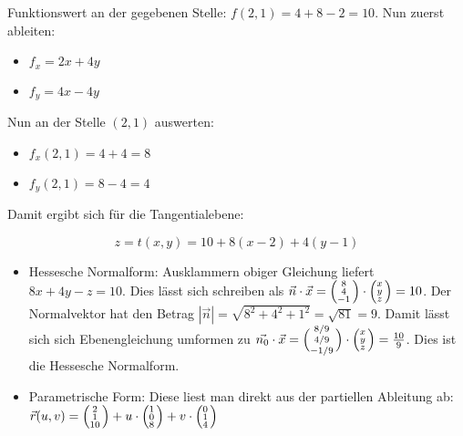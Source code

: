 \item Funktionswert an der gegebenen Stelle: $f(2,1) = 4+8-2=10$. Nun zuerst ableiten:

\begin{itemize}
\item $f_x = 2x+4y$
\item $f_y = 4x-4y$
\end{itemize}

Nun an der Stelle $(2,1)$ auswerten:

\begin{itemize}
\item $f_x(2,1) = 4+4 = 8$
\item $f_y(2,1) = 8-4 = 4$
\end{itemize}

Damit ergibt sich für die Tangentialebene:

$$z = t(x,y) = 10 + 8(x-2) + 4(y-1)$$

\begin{itemize}
\item Hessesche Normalform: Ausklammern obiger Gleichung liefert $8x+4y-z=10$. Dies lässt sich schreiben als $\vec{n}\cdot\vec{x} = \Bigl(\negthinspace\begin{smallmatrix}8\\4\\-1\end{smallmatrix}\Bigr)\cdot\Bigl(\negthinspace\begin{smallmatrix}x\\y\\z\end{smallmatrix}\Bigr) = 10$. Der Normalvektor hat den Betrag $|\vec{n}| = \sqrt{8^2+4^2+1^2} = \sqrt{81} = 9$. Damit lässt sich sich Ebenengleichung umformen zu $\vec{n_0}\cdot\vec{x} = \Bigl(\negthinspace\begin{smallmatrix}8/9\\4/9\\-1/9\end{smallmatrix}\Bigr)\cdot\Bigl(\negthinspace\begin{smallmatrix}x\\y\\z\end{smallmatrix}\Bigr) = \frac{10}{9}$. Dies ist die Hessesche Normalform.
\item Parametrische Form: Diese liest man direkt aus der partiellen Ableitung ab: $\vec{r}(u,v) = \Bigl(\negthinspace\begin{smallmatrix}2\\1\\10\end{smallmatrix}\Bigr) + u \cdot \Bigl(\negthinspace\begin{smallmatrix}1\\0\\8\end{smallmatrix}\Bigr) + v \cdot \Bigl(\negthinspace\begin{smallmatrix}0\\1\\4\end{smallmatrix}\Bigr)$
\end{itemize}

